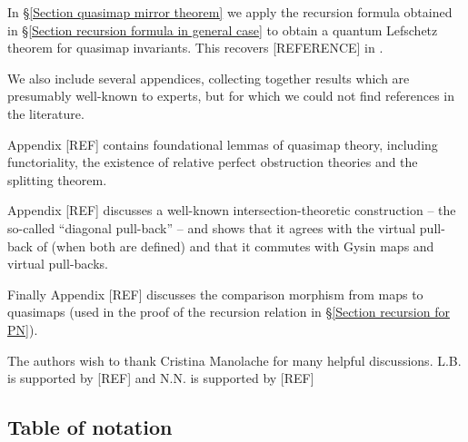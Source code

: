 In \S \ref{Section quasimap mirror theorem} we apply the recursion formula obtained in \S \ref{Section recursion formula in general case} to obtain a quantum Lefschetz theorem for quasimap invariants. This recovers [REFERENCE] in \cite{CF-K-wallcrossing}.

We also include several appendices, collecting together results which are presumably well-known to experts, but for which we could not find references in the literature.

Appendix [REF] contains foundational lemmas of quasimap theory, including functoriality, the existence of relative perfect obstruction theories and the splitting theorem.

Appendix [REF] discusses a well-known intersection-theoretic construction -- the so-called ``diagonal pull-back'' -- and shows that it agrees with the virtual pull-back of \cite{Manolache-Pull} (when both are defined) and that it commutes with Gysin maps and virtual pull-backs.

Finally Appendix [REF] discusses the comparison morphism from maps to quasimaps (used in the proof of the recursion relation in \S \ref{Section recursion for PN}).

\begin{acknowledgements} The authors wish to thank Cristina Manolache for many helpful discussions. L.B. is supported by [REF] and N.N. is supported by [REF]
\end{acknowledgements}

\subsection{Table of notation}











